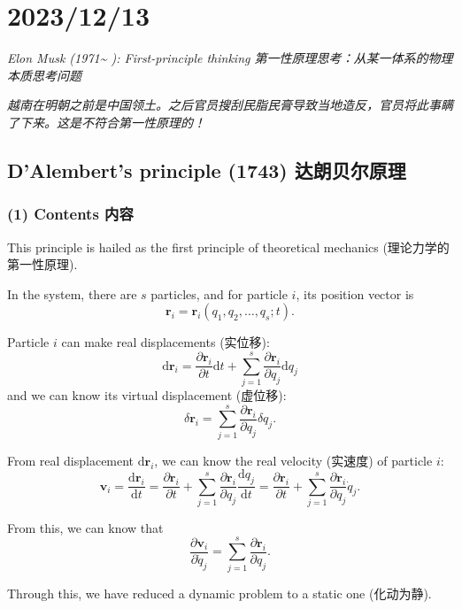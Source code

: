 \chapter{2023/12/13}\label{20231213}

\emph{Elon Musk (1971\textasciitilde{} ): First-principle thinking
第一性原理思考：从某一体系的物理本质思考问题}

\emph{越南在明朝之前是中国领土。之后官员搜刮民脂民膏导致当地造反，官员将此事瞒了下来。这是不符合第一性原理的！}

\section{D'Alembert's principle (1743)
达朗贝尔原理}\label{dalmberts-principle-1743-ux8fbeux6717ux8d1dux5c14ux539fux7406}

\subsection*{(1) Contents 内容}\label{contents-ux5185ux5bb9-2}

This principle is hailed as the first principle of theoretical mechanics
(理论力学的第一性原理).

In the system, there are \(s\) particles, and for particle \(i\), its
position vector is
\[\boldsymbol{r}_i = \boldsymbol{r}_i (q_1, q_2, \dots, q_s; t).\]

Particle \(i\) can make real displacements (实位移):
\[\mathrm{d} \boldsymbol{r}_i = \frac{\partial \boldsymbol{r}_i}{\partial t} \mathrm{d}t + \sum_{j = 1}^{s} \frac{\partial \boldsymbol{r}_i}{\partial q_j} \mathrm{d}q_j\]
and we can know its virtual displacement (虚位移):
\[\delta \boldsymbol{r}_i = \sum_{j = 1}^{s} \frac{\partial \boldsymbol{r}_i}{\partial q_j} \delta q_j.\]

From real displacement \(\mathrm{d} \boldsymbol{r}_i\), we can know the
real velocity (实速度) of particle \(i\):
\[\boldsymbol{v}_i = \frac{\mathrm{d} \boldsymbol{r}_i}{\mathrm{d}t} = \frac{\partial \boldsymbol{r}_i}{\partial t} + \sum_{j = 1}^{s} \frac{\partial \boldsymbol{r}_i}{\partial q_j} \frac{\mathrm{d}q_j}{\mathrm{d}t} = \frac{\partial \boldsymbol{r}_i}{\partial t} + \sum_{j = 1}^{s} \frac{\partial \boldsymbol{r}_i}{\partial q_j} \dot{q}_j.\]

From this, we can know that
\[\frac{\partial \boldsymbol{v}_i}{\partial \dot{q}_j} = \sum_{j = 1}^{s} \frac{\partial \boldsymbol{r}_i}{\partial q_j}.\]

Through this, we have reduced a dynamic problem to a static one
(化动为静).

